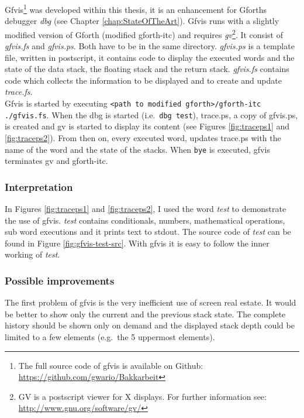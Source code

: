 Gfvis\footnote{The full source code of gfvis is available on Github: \url{https://github.com/gwario/Bakkarbeit}} was developed within this thesis, it is an enhancement for Gforths debugger \emph{dbg} (see Chapter \ref{chap:StateOfTheArt}).
Gfvis runs with a slightly modified version of Gforth (modified gforth-itc) and requires \emph{gv}\footnote{GV is a postscript viewer for X displays. For further information see: \url{http://www.gnu.org/software/gv/}}. It consist of \emph{gfvis.fs} and \emph{gfvis.ps}. Both have to be in the same directory. \emph{gfvis.ps} is a template file, written in postscript, it contains code to display the executed words and the state of the data stack, the floating stack and the return stack. \emph{gfvis.fs} contains code which collects the information to be displayed and to create and update \emph{trace.fs}.
\\
Gfvis is started by executing \verb|<path to modified gforth>/gforth-itc ./gfvis.fs|. When the dbg is started (i.e.\ \verb|dbg test|), trace.ps, a copy of gfvis.ps, is created and gv is started to display its content (see Figures \ref{fig:traceps1} and \ref{fig:traceps2}). From then on, every executed word, updates trace.ps with the name of the word and the state of the stacks. When \verb|bye| is executed, gfvis terminates gv and gforth-itc.

\subsubsection*{Interpretation}

In Figures \ref{fig:traceps1} and \ref{fig:traceps2}, I used the word \emph{test} to demonstrate the use of gfvis. \emph{test} contains conditionals, numbers, mathematical operations, sub word executions and it prints text to stdout. The source code of \emph{test} can be found in Figure \ref{fig:gfvis-test-src}. With gfvis it is easy to follow the inner working of \emph{test}.

\subsubsection*{Possible improvements}

The first problem of gfvis is the very inefficient use of screen real estate. It would be better to show only the current and the previous stack state. The complete history should be shown only on demand and the displayed stack depth could be limited to a few elements (e.g.\ the 5 uppermost elements).

